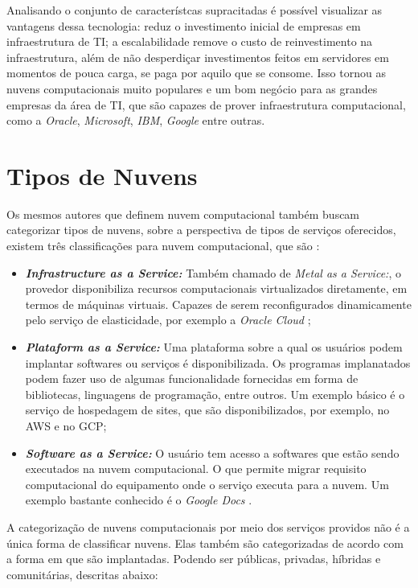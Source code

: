Analisando o conjunto de característcas supracitadas é possível visualizar as vantagens dessa tecnologia: reduz o investimento inicial de empresas em infraestrutura de TI; a escalabilidade remove o custo de reinvestimento na infraestrutura, além de não desperdiçar investimentos feitos em servidores em momentos de pouca carga, se paga por aquilo que se consome. Isso tornou as nuvens computacionais muito populares e um bom negócio para as grandes empresas da área de \acrfull{TI}, que são capazes de prover infraestrutura computacional, como a \textit{Oracle}, \textit{Microsoft}, \textit{IBM}, \textit{Google} entre outras.

\section{Tipos de Nuvens}

Os mesmos autores que definem nuvem computacional também buscam categorizar tipos de nuvens, sobre a perspectiva de tipos de serviços oferecidos, existem três classificações para nuvem computacional, que são \cite{NIST_CLOUD_DEFINITION} \cite{Vaquero:2008:BCT:1496091.1496100_Cloud_definition}:

\begin{itemize}
	\item \textbf{\textit{Infrastructure as a Service:}} Também chamado de \textit{Metal as a Service:}, o provedor disponibiliza recursos computacionais virtualizados diretamente, em termos de máquinas virtuais. Capazes de serem reconfigurados dinamicamente pelo serviço de elasticidade, por exemplo a \textit{Oracle Cloud} \cite{OracleCloud};
	\item \textbf{\textit{Plataform as a Service:}} Uma plataforma sobre a qual os usuários podem implantar softwares ou serviços é disponibilizada. Os programas implanatados podem fazer uso de algumas funcionalidade fornecidas em forma de bibliotecas, linguagens de programação, entre outros. Um exemplo básico é o serviço de hospedagem de sites, que são disponibilizados, por exemplo, no \acrfull{AWS} e no \acrfull{GCP};
	\item \textbf{\textit{Software as a Service:}} O usuário tem acesso a softwares que estão sendo executados na nuvem computacional. O que permite migrar requisito computacional do equipamento onde o serviço executa para a nuvem. Um exemplo bastante conhecido é o \textit{Google Docs} \cite{GoogleDocs}.
\end{itemize}

A categorização de nuvens computacionais por meio dos serviços providos não é a única forma de classificar nuvens. Elas também são categorizadas de acordo com a forma em que são implantadas. Podendo ser públicas, privadas, híbridas e comunitárias, descritas abaixo\cite{NIST_CLOUD_DEFINITION}:

